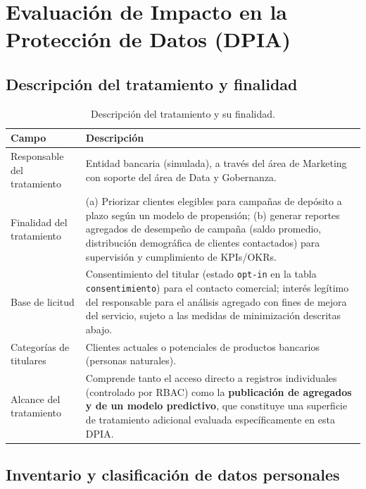 \documentclass[11pt,a4paper]{article}
\begin{document}
\section{Evaluación de Impacto en la Protección de Datos (DPIA)}

\subsection{Descripción del tratamiento y finalidad}

\begin{table}[htbp]
\centering
\small
\begin{tabularx}{\textwidth}{@{}p{3.6cm}X@{}}
\toprule
\textbf{Campo} & \textbf{Descripción} \\
\midrule
Responsable del tratamiento &
Entidad bancaria (simulada), a través del área de Marketing con soporte del área de Data y
Gobernanza. \\
\addlinespace
Finalidad del tratamiento &
(a) Priorizar clientes elegibles para campañas de depósito a plazo según un modelo de
propensión; (b) generar reportes agregados de desempeño de campaña (saldo promedio, distribución
demográfica de clientes contactados) para supervisión y cumplimiento de KPIs/OKRs. \\
\addlinespace
Base de licitud &
Consentimiento del titular (estado \texttt{opt-in} en la tabla \texttt{consentimiento}) para el
contacto comercial; interés legítimo del responsable para el análisis agregado con fines de
mejora del servicio, sujeto a las medidas de minimización descritas abajo. \\
\addlinespace
Categorías de titulares &
Clientes actuales o potenciales de productos bancarios (personas naturales). \\
\addlinespace
Alcance del tratamiento &
Comprende tanto el acceso directo a registros individuales (controlado por RBAC) como la
\textbf{publicación de agregados y de un modelo predictivo}, que constituye una superficie de
tratamiento adicional evaluada específicamente en esta DPIA. \\
\bottomrule
\end{tabularx}
\caption{Descripción del tratamiento y su finalidad.}
\end{table}

\subsection{Inventario y clasificación de datos personales}
\end{document}
